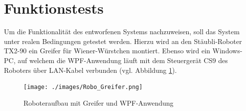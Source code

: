 \documentclass[ a4paper,
                oneside,
                toc=bibliography,
                toc=listof
                ]{scrbook}
\begin{document}
   	\section{Funktionstests}
   	Um die Funktionalität des entworfenen Systems nachzuweisen, soll das System unter realen Bedingungen getestet werden. Hierzu wird an den Stäubli-Roboter TX2-90 ein Greifer für Wiener-Würstchen montiert. Ebenso wird ein Windows-PC, auf welchem die WPF-Anwendung läuft mit dem Steuergerät CS9 des Roboters über LAN-Kabel verbunden (vgl. Abbildung \ref{fig:Robo}).
   	\begin{figure}[!ht]
   		\centering
   		\texttt{[image: ./images/Robo\_Greifer.png]}
   		\caption{Roboteraufbau mit Greifer und WPF-Anwendung}
   		\label{fig:Robo}
   	\end{figure}\\
   	
\end{document}
